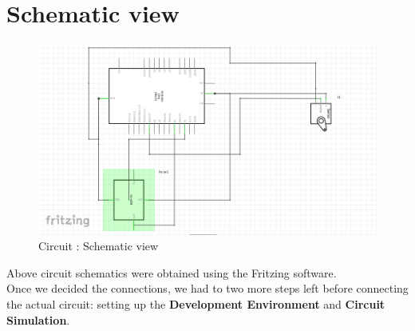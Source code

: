 \section{Schematic view}
\begin{figure}[H]
	\vfill
	\centering
	\includegraphics[width=\textwidth]{../Files/schematic}
	\caption{Circuit : Schematic view}  \label{fig:schematics}
\end{figure}
Above circuit schematics were obtained using the Fritzing software.\\
Once we decided the connections, we had to two more steps left before connecting the actual circuit: setting up the\textbf{ Development Environment} and \textbf{Circuit Simulation}.
